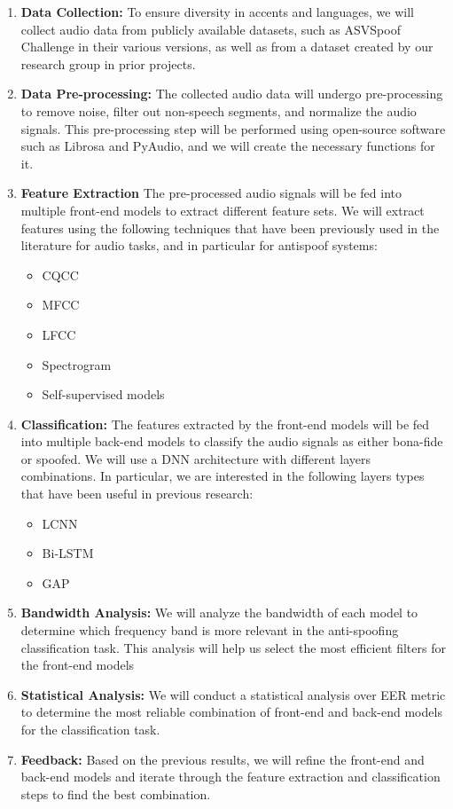 \begin{enumerate}
    \item \textbf{Data Collection:} To ensure diversity in accents and languages, we will collect audio data from publicly available datasets, such as ASVSpoof Challenge \cite{yamagishi2021asvspoof} in their various versions, as well as from a dataset created by our research group in prior projects.
    \item \textbf{Data Pre-processing:} The collected audio data will undergo pre-processing to remove noise, filter out non-speech segments, and normalize the audio signals. This pre-processing step will be performed using open-source software such as Librosa and PyAudio, and we will create the necessary functions for it.
    \item \textbf{Feature Extraction} The pre-processed audio signals will be fed into multiple front-end models to extract different feature sets. We will extract features using the following techniques that have been previously used in the literature for audio tasks, and in particular for antispoof systems: 
    \begin{itemize}
        \item \ac{CQCC}
        \item \ac{MFCC}
        \item \ac{LFCC}
        \item Spectrogram
        \item Self-supervised models
    \end{itemize}
    \item \textbf{Classification:} The features extracted by the front-end models will be fed into multiple back-end models to classify the audio signals as either bona-fide or spoofed. We will use a \ac{DNN} architecture with different layers combinations. In particular, we are interested in the following layers types that have been useful in previous research:
    \begin{itemize}
        \item \ac{LCNN}
        \item \ac{Bi-LSTM}
        \item \ac{GAP}
    \end{itemize}
    \item \textbf{Bandwidth Analysis:} We will analyze the bandwidth of each model to determine which frequency band is more relevant in the anti-spoofing classification task. This analysis will help us select the most efficient filters for the front-end models
    \item \textbf{Statistical Analysis:} We will conduct a statistical analysis over EER metric to determine the most reliable combination of front-end and back-end models for the classification task. %
    \item \textbf{Feedback:} Based on the previous results, we will refine the front-end and back-end models and iterate through the feature extraction and classification steps to find the best combination.
\end{enumerate}



\endinput
